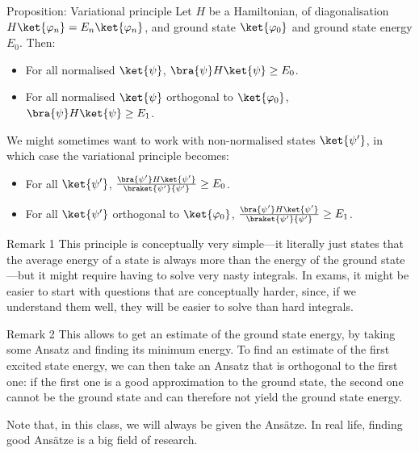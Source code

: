 \documentclass[a4paper]{article}
\begin{document}
\begin{parag}{Proposition: Variational principle}
    Let $H$ be a Hamiltonian, of diagonalisation $H \ket{\phi_n} = E_n \ket{\phi_n}$, and ground state $\ket{\phi_0}$ and ground state energy $E_0$. Then: 
    \begin{itemize}
        \item For all normalised $\ket{\psi}$, $\bra{\psi} H \ket{\psi} \geq E_0$.
        \item For all normalised $\ket{\psi}$ orthogonal to $\ket{\phi_0}$, $\bra{\psi} H \ket{\psi} \geq E_1$.
    \end{itemize}

    We might sometimes want to work with non-normalised states $\ket{\psi'}$, in which case the variational principle becomes: 
    \begin{itemize}
        \item For all $\displaystyle \ket{\psi'}$, $\frac{\bra{\psi'} H \ket{\psi'}}{\braket{\psi'}{\psi'}} \geq E_0$.
        \item For all $\ket{\psi'}$ orthogonal to $\displaystyle \ket{\phi_0}$, $\frac{\bra{\psi'} H \ket{\psi'}}{\braket{\psi'}{\psi'}} \geq E_1$.
    \end{itemize}
    
    \begin{subparag}{Remark 1}
        This principle is conceptually very simple---it literally just states that the average energy of a state is always more than the energy of the ground state---but it might require having to solve very nasty integrals. In exams, it might be easier to start with questions that are conceptually harder, since, if we understand them well, they will be easier to solve than hard integrals.
    \end{subparag}

    \begin{subparag}{Remark 2}
        This allows to get an estimate of the ground state energy, by taking some Ansatz and finding its minimum energy. To find an estimate of the first excited state energy, we can then take an Ansatz that is orthogonal to the first one: if the first one is a good approximation to the ground state, the second one cannot be the ground state and can therefore not yield the ground state energy.

        Note that, in this class, we will always be given the Ansätze. In real life, finding good Ansätze is a big field of research.  
    \end{subparag}


\end{parag}
\end{document}
